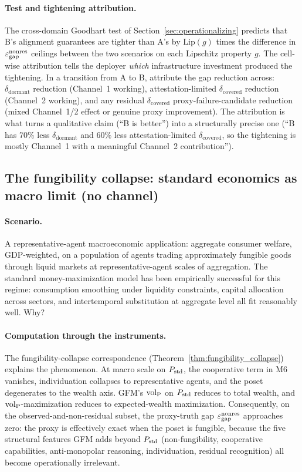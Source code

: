 \paragraph{Test and tightening attribution.}
The cross-domain Goodhart test of
Section~\ref{sec:operationalizing} predicts that B's alignment
guarantees are tighter than A's by
$\mathrm{Lip}(g)$ times the difference in $\varepsilon_{\mathrm{gap}}^{\mathrm{nonres}}$ ceilings
between the two scenarios
on each Lipschitz property $g$.  The cell-wise attribution
tells the deployer \emph{which} infrastructure investment
produced the tightening.  In a transition from A to B, attribute
the gap reduction across:
$\delta_{\mathrm{dormant}}$ reduction (Channel~1 working),
attestation-limited $\delta_{\mathrm{covered}}$ reduction
(Channel~2 working), and any residual $\delta_{\mathrm{covered}}$
proxy-failure-candidate reduction (mixed Channel~1/2 effect or
genuine proxy improvement).  The attribution is what turns a
qualitative claim (``B is better'') into a structurally
precise one (``B has 70\% less $\delta_{\mathrm{dormant}}$ and
60\% less attestation-limited $\delta_{\mathrm{covered}}$, so
the tightening is mostly Channel~1 with a meaningful Channel~2
contribution'').

\subsection{The fungibility collapse: standard economics as macro limit (no channel)}
\label{sec:wex_collapse}

\paragraph{Scenario.}
A representative-agent macroeconomic application: aggregate
consumer welfare, GDP-weighted, on a population of agents
trading approximately fungible goods through liquid markets at
representative-agent scales of aggregation.  The standard
money-maximization model has been empirically successful for
this regime: consumption smoothing under liquidity constraints,
capital allocation across sectors, and intertemporal substitution
at aggregate level all fit reasonably well.  Why?

\paragraph{Computation through the instruments.}
The fungibility-collapse correspondence
(Theorem~\ref{thm:fungibility_collapse}) explains the
phenomenon.  At macro scale on $P_{\mathrm{std}}$, the cooperative term
in M6 vanishes, individuation collapses to representative
agents, and the poset degenerates to the wealth axis.  GFM's
${\operatorname{vol}_{\mathrm{P}}}$ on $P_{\mathrm{std}}$ reduces to total wealth, and
${\operatorname{vol}_{\mathrm{P}}}$-maximization reduces to expected-wealth maximization.
Consequently, on the observed-and-non-residual subset, the
proxy-truth gap $\varepsilon_{\mathrm{gap}}^{\mathrm{nonres}}$ approaches zero: the proxy is
effectively exact when the poset is fungible, because the
five structural features GFM adds beyond $P_{\mathrm{std}}$
(non-fungibility, cooperative capabilities, anti-monopolar
reasoning, individuation, residual recognition) all become
operationally irrelevant.

